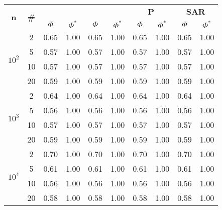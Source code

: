 \begin{table}
\begin{small}
		\bigskip
		\begin{tabular}{|c|c|cc|cc|cc|cc|}
			\hline
			\multirow{2}{*}{\textbf{n}} &
			\multirow{2}{*}{\textbf{\#}} &
			\multicolumn{2}{c|}{\textbf{\astar}} &
			\multicolumn{2}{c|}{\textbf{\ambush}} &
			\multicolumn{2}{c|}{\textbf{P}} &
			\multicolumn{2}{c|}{\textbf{SAR}}\\
			& & $\Phi$ & $\Phi^*$ & $\Phi$ & $\Phi^*$&
			$\Phi$ & $\Phi^*$& $\Phi$ & $\Phi^*$\\
			\hline
			\multirow{4}{*}{$10^2$}
			 & 2 & 0.65 & 1.00 & 0.65 & 1.00 & 0.65 & 1.00 & 0.65 & 1.00\\
			 & 5 & 0.57 & 1.00 & 0.57 & 1.00 & 0.57 & 1.00 & 0.57 & 1.00\\
			 & 10 & 0.57 & 1.00 & 0.57 & 1.00 & 0.57 & 1.00 & 0.57 & 1.00\\
			 & 20 & 0.59 & 1.00 & 0.59 & 1.00 & 0.59 & 1.00 & 0.59 & 1.00\\
			\hline
			\multirow{4}{*}{$10^3$}
			 & 2 & 0.64 & 1.00 & 0.64 & 1.00 & 0.64 & 1.00 & 0.64 & 1.00\\
			 & 5 & 0.56 & 1.00 & 0.56 & 1.00 & 0.56 & 1.00 & 0.56 & 1.00\\
			 & 10 & 0.57 & 1.00 & 0.57 & 1.00 & 0.57 & 1.00 & 0.57 & 1.00\\
			 & 20 & 0.59 & 1.00 & 0.59 & 1.00 & 0.59 & 1.00 & 0.59 & 1.00\\
			 \hline
			\multirow{4}{*}{$10^4$}
			 & 2 & 0.70 & 1.00 & 0.70 & 1.00 & 0.70 & 1.00 & 0.70 & 1.00\\
			 & 5 & 0.61 & 1.00 & 0.61 & 1.00 & 0.61 & 1.00 & 0.61 & 1.00\\
			 & 10 & 0.56 & 1.00 & 0.56 & 1.00 & 0.56 & 1.00 & 0.56 & 1.00\\
			 & 20 & 0.58 & 1.00 & 0.58 & 1.00 & 0.58 & 1.00 & 0.58 & 1.00\\
			 \hline
		\end{tabular}
	\end{small}
\end{table}
